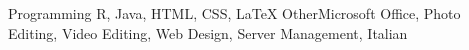 \begin{cvskills}
	\cvskill
		{Programming}
		{R, Java, HTML, CSS, LaTeX}
	\cvskill
		{Other}{Microsoft Office, Photo Editing, Video Editing, Web Design, Server Management, Italian}
\end{cvskills}